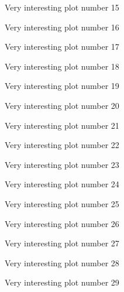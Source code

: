 \begin{figure}

\caption{Very interesting plot number 15}
\end{figure}
\begin{figure}

\caption{Very interesting plot number 16}
\end{figure}
\begin{figure}

\caption{Very interesting plot number 17}
\end{figure}
\begin{figure}

\caption{Very interesting plot number 18}
\end{figure}
\begin{figure}

\caption{Very interesting plot number 19}
\end{figure}
\begin{figure}

\caption{Very interesting plot number 20}
\end{figure}
\begin{figure}

\caption{Very interesting plot number 21}
\end{figure}
\begin{figure}

\caption{Very interesting plot number 22}
\end{figure}
\begin{figure}

\caption{Very interesting plot number 23}
\end{figure}
\begin{figure}

\caption{Very interesting plot number 24}
\end{figure}
\begin{figure}

\caption{Very interesting plot number 25}
\end{figure}
\begin{figure}

\caption{Very interesting plot number 26}
\end{figure}
\begin{figure}

\caption{Very interesting plot number 27}
\end{figure}
\begin{figure}

\caption{Very interesting plot number 28}
\end{figure}
\begin{figure}

\caption{Very interesting plot number 29}
\end{figure}